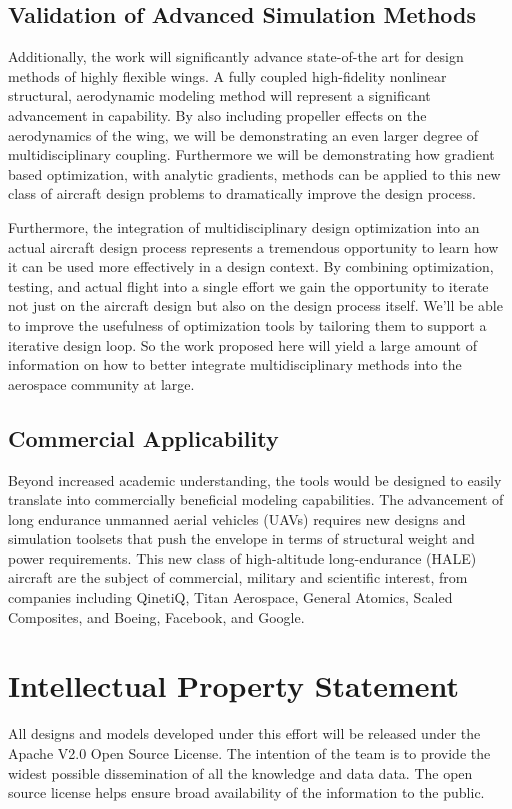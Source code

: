 \documentclass[]{aiaa-tc}
\begin{document}
    \subsection{Validation of Advanced Simulation Methods}
    Additionally, the work will significantly advance state-of-the art for design methods of highly flexible wings. 
    A fully coupled high-fidelity nonlinear structural, aerodynamic modeling method will represent a significant advancement 
    in capability. By also including propeller effects on the aerodynamics of the wing, we will be demonstrating an even larger 
    degree of multidisciplinary coupling. Furthermore we will be demonstrating 
    how gradient based optimization, with analytic gradients, methods can be applied to this new class of aircraft design problems 
    to dramatically improve the design process.

    Furthermore, the integration of multidisciplinary design optimization into an actual aircraft design process represents
    a tremendous opportunity to learn how it can be used more effectively in a design context. By combining optimization, 
    testing, and actual flight into a single effort we gain the opportunity to iterate not just on the aircraft 
    design but also on the design process itself. We'll be able to improve the usefulness of optimization tools by 
    tailoring them to support a iterative design loop. So the work proposed here will yield a large amount 
    of information on how to better integrate multidisciplinary methods into the aerospace community at large. 

    \subsection{Commercial Applicability}
    Beyond increased academic understanding, the tools would be designed to easily translate into commercially beneficial
    modeling capabilities. The advancement of long endurance unmanned aerial vehicles (UAVs) requires new designs
    and simulation toolsets that push the envelope in terms of structural weight and power requirements. 
    This new class of high-altitude long-endurance (HALE) aircraft are the subject of commercial,
    military and scientific interest, from companies including QinetiQ, Titan Aerospace, General Atomics, Scaled Composites, and Boeing, 
    Facebook, and Google. 

  
\section{Intellectual Property Statement}
    All designs and models developed under this effort will be released under the Apache V2.0 Open Source License. The intention 
    of the team is to provide the widest possible dissemination of all the knowledge and data data. The open source license helps 
    ensure broad availability of the information to the public. 
\end{document}
